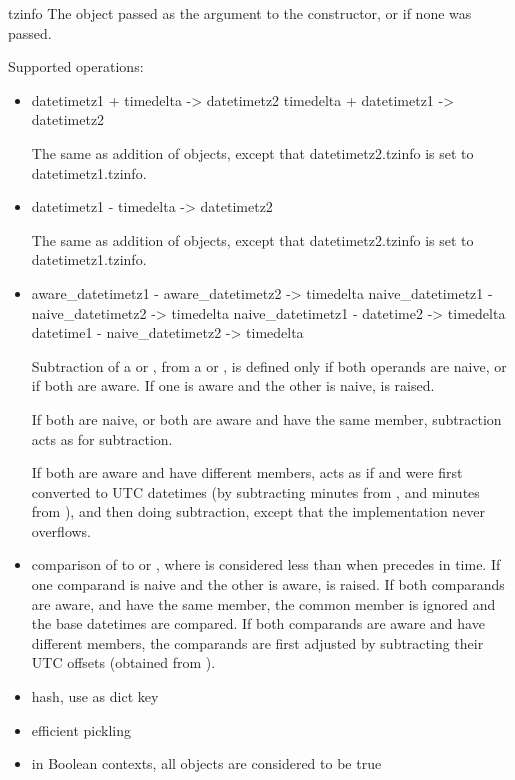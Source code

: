 \begin{memberdesc}{tzinfo}
  The object passed as the  argument to the
   constructor, or  if none was passed.
\end{memberdesc}

Supported operations:

\begin{itemize}
  \item
    datetimetz1 + timedelta -> datetimetz2
    timedelta + datetimetz1 -> datetimetz2

    The same as addition of  objects, except that
    datetimetz2.tzinfo is set to datetimetz1.tzinfo.

  \item
    datetimetz1 - timedelta -> datetimetz2

    The same as addition of  objects, except that
    datetimetz2.tzinfo is set to datetimetz1.tzinfo.

  \item
    aware_datetimetz1 - aware_datetimetz2 -> timedelta
    naive_datetimetz1 - naive_datetimetz2 -> timedelta
    naive_datetimetz1 - datetime2 -> timedelta
    datetime1 - naive_datetimetz2 -> timedelta

    Subtraction of a  or , from a
     or , is defined only if both
    operands are naive, or if both are aware.  If one is aware and the
    other is naive,  is raised.

    If both are naive, or both are aware and have the same 
    member, subtraction acts as for  subtraction.

    If both are aware and have different  members,
     acts as if  and  were first converted to UTC
    datetimes (by subtracting  minutes from ,
    and  minutes from ), and then doing
     subtraction, except that the implementation never
    overflows.

  \item
    comparison of  to  or
    , where  is considered less than 
    when  precedes  in time.  If one comparand is naive and
    the other is aware,  is raised.  If both
    comparands are aware, and have the same  member,
    the common  member is ignored and the base datetimes
    are compared.  If both comparands are aware and have different
     members, the comparands are first adjusted by
    subtracting their UTC offsets (obtained from ).

  \item
    hash, use as dict key

  \item
    efficient pickling

  \item
    in Boolean contexts, all  objects are considered to be
    true
\end{itemize}

